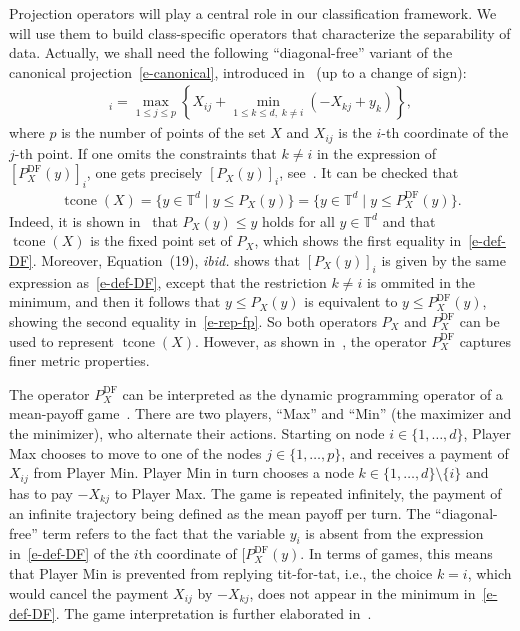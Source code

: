 \documentclass{article}
\newcommand{\tcone}{\operatorname{tcone}}
\renewcommand{\leq}{\leqslant}
\newcommand{\trop}{\mathbb{T}}
\begin{document}
Projection operators will play a central role in our classification framework. We will use them to build class-specific operators that characterize the separability of data.
Actually, we shall need the following ``diagonal-free'' variant of the canonical projection~\eqref{e-canonical},
introduced in~\cite[Equation~(9)]{akiangaubertqisaadi} (up to a change of sign):
\begin{align}
  [P_X^{\text{DF}}(y)]_i = \max_{1 \leq j \leq p} \left\{X_{ij} + \min_{1\leq k\leq d,\; k \neq i} (-X_{kj} + y_k)\right\},
  \label{e-def-DF}
\end{align}
where $p$ is the number of points of the set $X$ and $X_{ij}$ is the $i$-th coordinate of the $j$-th point.
If one omits the constraints that $k\neq i$ in the expression of $[P_X^{\text{DF}}(y)]_i$, one gets
precisely $[P_X(y)]_i$, see~\cite[Theorem~5]{cohen2004}.  It can be checked that 
\begin{align}
  \label{e-rep-fp}
  \tcone(X)= \{y\in \trop^d\mid y\leq P_X(y)\} = \{y\in \trop^d\mid y\leq P_X^{\text{DF}}(y)\}.
\end{align}
Indeed, it is shown in~\cite[Section 3.1]{cohen2004} that $P_X(y)\leq y$ holds for all $y\in \trop^d$ and that $\tcone(X)$ is the fixed point set of $P_X$,
which shows the first equality in~\eqref{e-def-DF}. Moreover, Equation~(19), {\em ibid.} shows that $[P_X(y)]_i$ is given by the same expression as~\eqref{e-def-DF}, except that the restriction $k\neq i$ is ommited in the minimum, and then it follows that $y\leq P_X(y)$ is equivalent to $y\leq P_X^{\text{DF}}(y)$,
showing the second equality in~\eqref{e-rep-fp}.
So both operators $P_X$ and $P_X^{\text{DF}}$ can be used to represent $\tcone(X)$. However, as shown in~\cite[Theorem~6]{akiangaubertqisaadi}, the operator $P_X^{\text{DF}}$ captures finer metric properties.

The operator $P_X^{\text{DF}}$ can be interpreted as the dynamic programming operator of a mean-payoff game~\cite{AGGut10}.
There are two players, ``Max'' and ``Min'' (the maximizer
and the minimizer), who alternate their actions. Starting on node
$i\in \{1,\dots,d\}$, Player Max chooses to move to one of the nodes $j\in \{1,\dots,p\}$, and receives a payment of $X_{ij}$
from Player Min. Player Min in turn chooses a node $k\in \{1,\dots,d\}\setminus\{i\}$ and has to pay $-X_{kj}$ to Player Max. The game is repeated infinitely,
the payment of an infinite trajectory being defined as the mean payoff per turn.
The ``diagonal-free'' term refers to the fact that the variable $y_i$
is absent from the expression in~\eqref{e-def-DF}
of the $i$th coordinate of  $[P_X^{\text{DF}}(y)$. In terms
  of games, this means that Player Min is prevented from replying tit-for-tat,
  i.e., the choice $k=i$, which would cancel the payment $X_{ij}$
  by $-X_{kj}$, does not appear in the minimum in~\eqref{e-def-DF}.
  The game interpretation is further elaborated in~\cite{akiangaubertqisaadi}.
\end{document}
